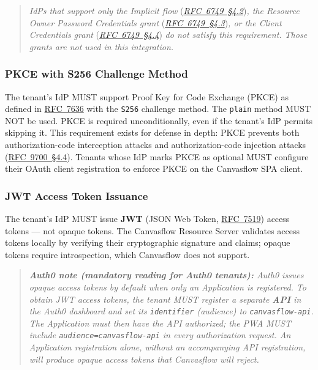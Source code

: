 \begin{quote}
  \textit{IdPs that support only the Implicit flow} (\href{https://datatracker.ietf.org/doc/html/rfc6749#section-4.2}{\textit{RFC~6749~\S4.2}})\textit{,
  the Resource Owner Password Credentials grant} (\href{https://datatracker.ietf.org/doc/html/rfc6749#section-4.3}{\textit{RFC~6749~\S4.3}})\textit{, 
  or the Client Credentials grant} (\href{https://datatracker.ietf.org/doc/html/rfc6749#section-4.4}{\textit{RFC~6749~\S4.4}}) \textit{do not satisfy this requirement. Those grants are not used in this
  integration.}
\end{quote}


\subsubsection{PKCE with S256 Challenge Method}



The tenant's IdP MUST support Proof Key for Code Exchange (PKCE) as defined in
\href{https://datatracker.ietf.org/doc/html/rfc7636}{RFC~7636} with the \texttt{S256} 
challenge method. The \texttt{plain} method MUST NOT be used. PKCE is required unconditionally, 
even if the tenant's IdP permits skipping it. This requirement exists for defense in depth: PKCE prevents both
authorization-code interception attacks and authorization-code injection attacks
(\href{https://datatracker.ietf.org/doc/html/rfc9700#section-4.4}{RFC~9700~\S4.4}). Tenants whose IdP marks PKCE as optional MUST configure their OAuth
client registration to enforce PKCE on the Canvasflow SPA client.

\pagebreak

\subsubsection{JWT Access Token Issuance}

The tenant's IdP MUST issue \textbf{JWT} (JSON Web Token, 
\href{https://datatracker.ietf.org/doc/html/rfc7519}{RFC~7519}) access 
tokens --- not opaque tokens. The Canvasflow Resource Server validates access 
tokens locally by verifying their cryptographic signature and claims; opaque 
tokens require introspection, which Canvasflow does not support.
\begin{quote}
  \textit{\textbf{Auth0 note (mandatory reading for Auth0 tenants):} Auth0 issues opaque access
  tokens by default when only an Application is registered. To obtain JWT access tokens,
  the tenant MUST register a separate \textbf{API} in the Auth0 dashboard and set its
  \texttt{identifier} (audience) to \texttt{canvasflow-api}. The Application must then
  have the API authorized; the PWA MUST include \texttt{audience=canvasflow-api} in every
  authorization request. An Application registration alone, without an accompanying API
  registration, will produce opaque access tokens that Canvasflow will reject.}
\end{quote}


